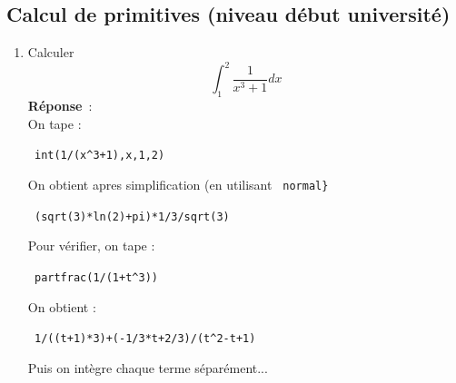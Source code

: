\documentclass{article}
\begin{document}
\subsection{Calcul de primitives (niveau d\'ebut universit\'e)}
\begin{enumerate}
\item Calculer $$\int_1^2\frac{1}{x^3+1}dx$$
{\bf R\'eponse}~:\\
On tape :
\begin{center}
\verb| int(1/(x^3+1),x,1,2)|
\end{center}
On obtient apres simplification (en utilisant \verb| normal} |
\begin{center}
 \verb| (sqrt(3)*ln(2)+pi)*1/3/sqrt(3)|
\end{center}
Pour v\'erifier, on tape :
\begin{center}
\verb| partfrac(1/(1+t^3))|
\end{center}
On obtient :
\begin{center}
\verb| 1/((t+1)*3)+(-1/3*t+2/3)/(t^2-t+1)|
\end{center}
Puis on int\`egre chaque terme s\'epar\'ement...


\end{enumerate}
\end{document}
